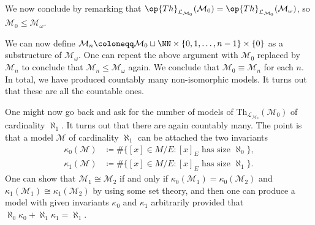 \documentclass[../notes.tex]{subfiles}
\begin{document}
We now conclude by remarking that $\op{Th}_{\mathcal L_{\mathcal M_0}}(\mathcal M_0)=\op{Th}_{\mathcal L_{\mathcal M_0}}(\mathcal M_\omega)$, so $\mathcal M_0\le\mathcal M_\omega$.
\begin{remark}
	We can now define $\mathcal M_n\coloneqq\mathcal M_0\sqcup\NN\times\{0,1,\ldots,n-1\}\times\{0\}$ as a substructure of $\mathcal M_\omega$. One can repeat the above argument with $\mathcal M_0$ replaced by $\mathcal M_n$ to conclude that $\mathcal M_n\le\mathcal M_\omega$ again. We conclude that $\mathcal M_0\equiv\mathcal M_n$ for each $n$. In total, we have produced countably many non-isomorphic models. It turns out that these are all the countable ones.
\end{remark}
One might now go back and ask for the number of models of $\mathrm{Th}_{\mathcal L_{\mathcal M_0}}(\mathcal M_0)$ of cardinality $\aleph_1$. It turns out that there are again countably many. The point is that a model $\mathcal M$ of cardinality $\aleph_1$ can be attached the two invariants
\begin{align*}
	\kappa_0(\mathcal M) &\coloneqq \#\{[x]\in M/E:[x]_E\text{ has size }\aleph_0\}, \\
	\kappa_1(\mathcal M) &\coloneqq \#\{[x]\in M/E:[x]_E\text{ has size }\aleph_1\}.
\end{align*}
One can show that $\mathcal M_1\cong\mathcal M_2$ if and only if $\kappa_0(\mathcal M_1)=\kappa_0(\mathcal M_2)$ and $\kappa_1(\mathcal M_1)\cong\kappa_1(\mathcal M_2)$ by using some set theory, and then one can produce a model with given invariants $\kappa_0$ and $\kappa_1$ arbitrarily provided that $\aleph_0\kappa_0+\aleph_1\kappa_1=\aleph_1$.
\end{document}
